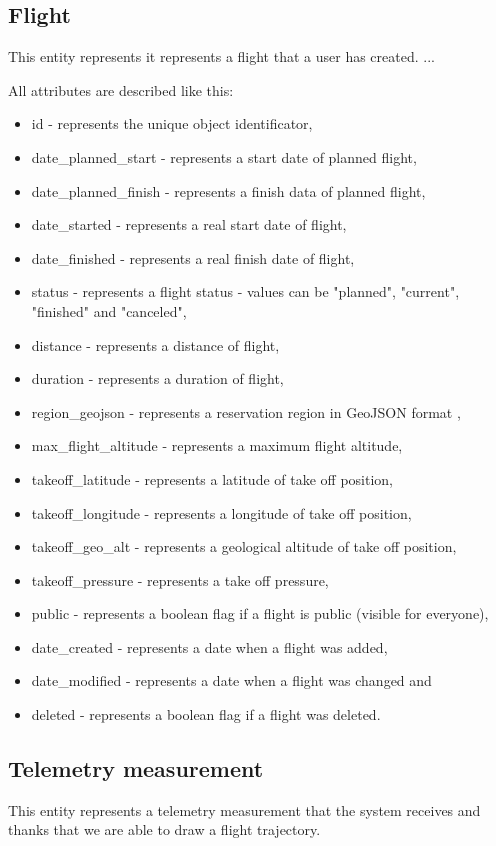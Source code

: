 \subsection{Flight}\label{subsec:flight}
This entity represents it represents a flight that a user has created.
... %

All attributes are described like this:
\begin{itemize}
    \item id - represents the unique object identificator,
    \item date\_planned\_start - represents a start date of planned flight,
    \item date\_planned\_finish - represents a finish data of planned flight,
    \item date\_started - represents a real start date of flight,
    \item date\_finished - represents a real finish date of flight,
    \item status - represents a flight status - values can be "planned", "current", "finished" and "canceled",
    \item distance - represents a distance of flight,
    \item duration - represents a duration of flight,
    \item region\_geojson - represents a reservation region in GeoJSON format \cite{geoJson},
    \item max\_flight\_altitude - represents a maximum flight altitude,
    \item takeoff\_latitude - represents a latitude of take off position,
    \item takeoff\_longitude - represents a longitude of take off position,
    \item takeoff\_geo\_alt - represents a geological altitude of take off position,
    \item takeoff\_pressure - represents a take off pressure,
    \item public - represents a boolean flag if a flight is public (visible for everyone),
    \item date\_created - represents a date when a flight was added,
    \item date\_modified - represents a date when a flight was changed and
    \item deleted - represents a boolean flag if a flight was deleted.
\end{itemize}

\subsection{Telemetry measurement}\label{subsec:telemetry-measurement}
This entity represents a telemetry measurement that the system receives and thanks that we are able to draw a flight trajectory.

